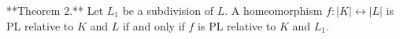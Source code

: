 **Theorem 2.** Let $L_1$ be a subdivision of $L$. A homeomorphism $f: |K| \leftrightarrow |L|$ is PL relative to $K$ and $L$ if and only if $f$ is PL relative to $K$ and $L_1$.
